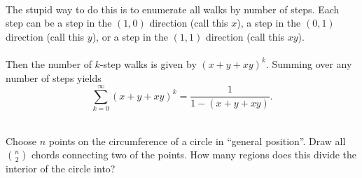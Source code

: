 \documentclass{article}
\newenvironment{problem}[2][Problem]{\begin{trivlist}
\item[\hskip \labelsep {\bfseries #1}\hskip \labelsep {\bfseries #2.}]}{\end{trivlist}}
\newenvironment{solution}[1][Solution.]{\begin{trivlist}
\item[\hskip \labelsep {\bfseries #1}]}{\end{trivlist}}
\begin{document}
\begin{solution} \text{} \\
  The stupid way to do this is to enumerate all walks by number of steps.
  Each step can be a step in the $(1, 0)$ direction (call this $x$), a step
  in the $(0, 1)$ direction (call this $y$), or a step in the $(1, 1)$
  direction (call this $xy$).
  \\~\\
  Then the number of $k$-step walks is given by $(x + y + xy)^k$. Summing
  over any number of steps yields \[
    \sum_{k=0}^\infty (x + y + xy)^k = \frac{1}{1 - (x + y + xy)}.
  \]
\end{solution}
\pagebreak
\begin{problem}{12} \text{} \\
  Choose $n$ points on the circumference of a circle in ``general position''.
  Draw all $\binom n 2$ chords connecting two of the points. How many regions
  does this divide the interior of the circle into?
\end{problem}
\end{document}
